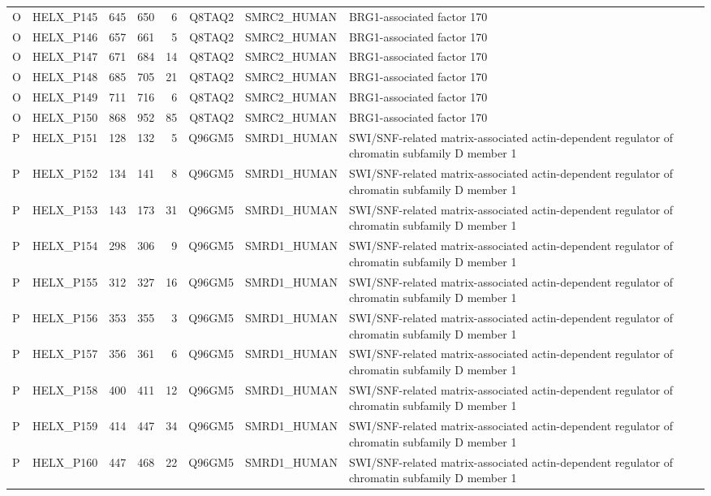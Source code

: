 \begin{longtable}{@{}llrrrrllp{5.2cm}@{}}
  O & HELX_P145 & 645 & 650 & 6 & Q8TAQ2 & SMRC2_HUMAN & BRG1-associated factor 170 \\
  O & HELX_P146 & 657 & 661 & 5 & Q8TAQ2 & SMRC2_HUMAN & BRG1-associated factor 170 \\
  O & HELX_P147 & 671 & 684 & 14 & Q8TAQ2 & SMRC2_HUMAN & BRG1-associated factor 170 \\
  O & HELX_P148 & 685 & 705 & 21 & Q8TAQ2 & SMRC2_HUMAN & BRG1-associated factor 170 \\
  O & HELX_P149 & 711 & 716 & 6 & Q8TAQ2 & SMRC2_HUMAN & BRG1-associated factor 170 \\
  O & HELX_P150 & 868 & 952 & 85 & Q8TAQ2 & SMRC2_HUMAN & BRG1-associated factor 170 \\
  P & HELX_P151 & 128 & 132 & 5 & Q96GM5 & SMRD1_HUMAN & SWI/SNF-related matrix-associated actin-dependent regulator of chromatin subfamily D member 1 \\
  P & HELX_P152 & 134 & 141 & 8 & Q96GM5 & SMRD1_HUMAN & SWI/SNF-related matrix-associated actin-dependent regulator of chromatin subfamily D member 1 \\
  P & HELX_P153 & 143 & 173 & 31 & Q96GM5 & SMRD1_HUMAN & SWI/SNF-related matrix-associated actin-dependent regulator of chromatin subfamily D member 1 \\
  P & HELX_P154 & 298 & 306 & 9 & Q96GM5 & SMRD1_HUMAN & SWI/SNF-related matrix-associated actin-dependent regulator of chromatin subfamily D member 1 \\
  P & HELX_P155 & 312 & 327 & 16 & Q96GM5 & SMRD1_HUMAN & SWI/SNF-related matrix-associated actin-dependent regulator of chromatin subfamily D member 1 \\
  P & HELX_P156 & 353 & 355 & 3 & Q96GM5 & SMRD1_HUMAN & SWI/SNF-related matrix-associated actin-dependent regulator of chromatin subfamily D member 1 \\
  P & HELX_P157 & 356 & 361 & 6 & Q96GM5 & SMRD1_HUMAN & SWI/SNF-related matrix-associated actin-dependent regulator of chromatin subfamily D member 1 \\
  P & HELX_P158 & 400 & 411 & 12 & Q96GM5 & SMRD1_HUMAN & SWI/SNF-related matrix-associated actin-dependent regulator of chromatin subfamily D member 1 \\
  P & HELX_P159 & 414 & 447 & 34 & Q96GM5 & SMRD1_HUMAN & SWI/SNF-related matrix-associated actin-dependent regulator of chromatin subfamily D member 1 \\
  P & HELX_P160 & 447 & 468 & 22 & Q96GM5 & SMRD1_HUMAN & SWI/SNF-related matrix-associated actin-dependent regulator of chromatin subfamily D member 1 \\

\end{longtable}

